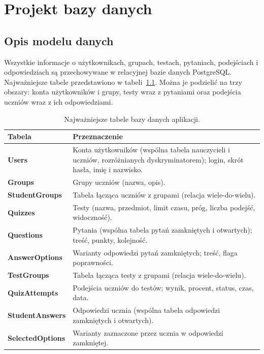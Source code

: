 ﻿\chapter{Projekt bazy danych}
\label{cha:baza}

\section{Opis modelu danych}
\label{sec:modelDanych}

Wszystkie informacje o użytkownikach, grupach, testach, pytaniach, podejściach i odpowiedziach są
przechowywane w relacyjnej bazie danych PostgreSQL. Najważniejsze tabele przedstawiono
w tabeli~\ref{tab:tabele}. Można je podzielić na trzy obszary: konta użytkowników i grupy, testy
wraz z pytaniami oraz podejścia uczniów wraz z ich odpowiedziami.

\begin{table}[htbp]
  \centering
  \caption{Najważniejsze tabele bazy danych aplikacji.}
  \label{tab:tabele}
  \begin{tabularx}{\linewidth}{>{\bfseries}l X}
    \toprule
    Tabela & Przeznaczenie \\
    \midrule
    Users & Konta użytkowników (wspólna tabela nauczycieli i uczniów, rozróżnianych
            dyskryminatorem); login, skrót hasła, imię i nazwisko. \\
    Groups & Grupy uczniów (nazwa, opis). \\
    StudentGroups & Tabela łącząca uczniów z grupami (relacja wiele-do-wielu). \\
    Quizzes & Testy (nazwa, przedmiot, limit czasu, próg, liczba podejść, widoczność). \\
    Questions & Pytania (wspólna tabela pytań zamkniętych i otwartych); treść, punkty, kolejność. \\
    AnswerOptions & Warianty odpowiedzi pytań zamkniętych; treść, flaga poprawności. \\
    TestGroups & Tabela łącząca testy z grupami (relacja wiele-do-wielu). \\
    QuizAttempts & Podejścia uczniów do testów; wynik, procent, status, czas, data. \\
    StudentAnswers & Odpowiedzi ucznia (wspólna tabela odpowiedzi zamkniętych i otwartych). \\
    SelectedOptions & Warianty zaznaczone przez ucznia w odpowiedzi zamkniętej. \\
    \bottomrule
  \end{tabularx}
\end{table}

